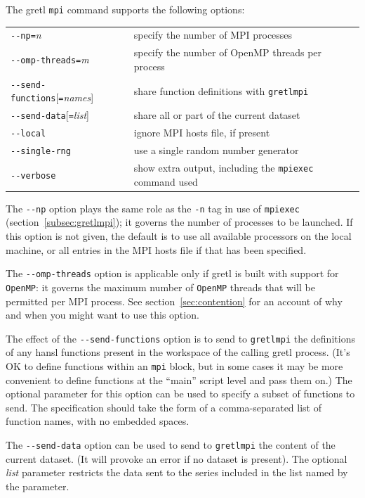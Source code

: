 \documentclass{article}
\begin{document}
The gretl \texttt{mpi} command supports the following options:
\begin{center}
\begin{tabular}{ll}
\verb|--|\texttt{np=}\textsl{n} & specify the number of MPI processes\\
\verb|--|\texttt{omp-threads=}\textsl{m} &
  specify the number of OpenMP threads per process \\
\verb|--|\texttt{send-functions}[\texttt{=}\textsl{names}] &
  share function definitions with \texttt{gretlmpi} \\
\verb|--|\texttt{send-data}[\texttt{=}\textsl{list}] &
  share all or part of the current dataset \\
\verb|--|\texttt{local} & ignore MPI hosts file, if present \\
\verb|--|\texttt{single-rng} &
  use a single random number generator \\
\verb|--|\texttt{verbose} & show extra output, including
  the \texttt{mpiexec} command used
\end{tabular}
\end{center}

The \verb|--np| option plays the same role as the \verb|-n| tag in use
of \texttt{mpiexec} (section~\ref{subsec:gretlmpi}); it governs
the number of processes to be launched. If this option is not given,
the default is to use all available processors on the local machine,
or all entries in the MPI hosts file if that has been specified.

The \verb|--omp-threads| option is applicable only if gretl is built
with support for \texttt{OpenMP}: it governs the maximum number of
\texttt{OpenMP} threads that will be permitted per MPI process.  See
section~\ref{sec:contention} for an account of why and when you might
want to use this option.

The effect of the \verb|--send-functions| option is to send to
\texttt{gretlmpi} the definitions of any hansl functions present in the
workspace of the calling gretl process. (It's OK to define functions
within an \texttt{mpi} block, but in some cases it may be more
convenient to define functions at the ``main'' script level and pass
them on.) The optional parameter for this option can be used to specify
a subset of functions to send. The specification should take the form of
a comma-separated list of function names, with no embedded spaces.

The \verb|--send-data| option can be used to send to \texttt{gretlmpi}
the content of the current dataset. (It will provoke an error if no
dataset is present). The optional \textsl{list} parameter restricts
the data sent to the series included in the list named by the
parameter.
\end{document}
